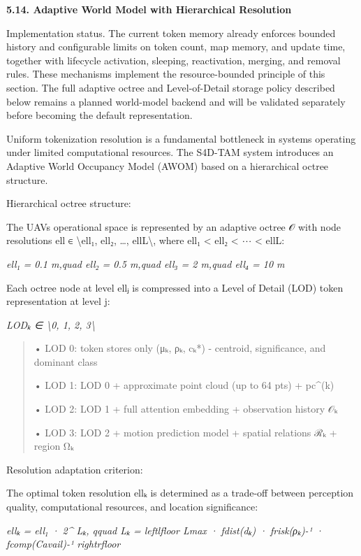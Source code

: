 \documentclass[
]{article}
\begin{document}
\textbf{5.14. Adaptive World Model with Hierarchical Resolution}

Implementation status. The current token memory already enforces bounded
history and configurable limits on token count, map memory, and update
time, together with lifecycle activation, sleeping, reactivation,
merging, and removal rules. These mechanisms implement the
resource-bounded principle of this section. The full adaptive octree and
Level-of-Detail storage policy described below remains a planned
world-model backend and will be validated separately before becoming the
default representation.

Uniform tokenization resolution is a fundamental bottleneck in systems
operating under limited computational resources. The S4D-TAM system
introduces an Adaptive World Occupancy Model (AWOM) based on a
hierarchical octree structure.

Hierarchical octree structure:

The UAV\textquotesingle s operational space is represented by an
adaptive octree 𝒪 with node resolutions ell ∈ \textbackslash ell₁, ell₂,
\ldots, ellL\textbackslash, where ell₁ \textless{} ell₂ \textless{} ⋯
\textless{} ellL:

\emph{ell₁ = 0.1 m,quad ell₂ = 0.5 m,quad ell₃ = 2 m,quad ell₄ = 10 m}

Each octree node at level ellⱼ is compressed into a Level of Detail
(LOD) token representation at level j:

\emph{LODₖ ∈ \textbackslash0, 1, 2, 3\textbackslash{}}

\begin{quote}
• LOD 0: token stores only (μₖ, ρₖ, cₖ*) - centroid, significance, and
dominant class

• LOD 1: LOD 0 + approximate point cloud (up to 64 pts) + pc\^{}(k)

• LOD 2: LOD 1 + full attention embedding + observation history 𝒪ₖ

• LOD 3: LOD 2 + motion prediction model + spatial relations ℛₖ + region
Ωₖ
\end{quote}

Resolution adaptation criterion:

The optimal token resolution ellₖ is determined as a trade-off between
perception quality, computational resources, and location significance:

\emph{ellₖ = ell₁ · 2\^{} Lₖ, qquad Lₖ = leftlfloor Lmax · fdist(dₖ) ·
frisk(ρₖ)-¹ · fcomp(Cavail)-¹ rightrfloor}
\end{document}
